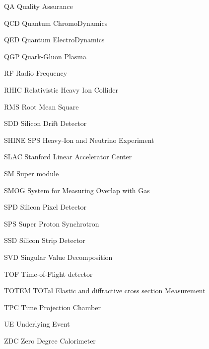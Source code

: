 \begin{abbrv}
\item[QA]				Quality Assurance
\item[QCD]			Quantum ChromoDynamics
\item[QED]			Quantum ElectroDynamics
\item[QGP]			Quark-Gluon Plasma
 

\item[RF]				Radio Frequency
\item[RHIC]			Relativistic Heavy Ion Collider
\item[RMS]			Root Mean Square

\item[SDD]			Silicon Drift Detector
\item[SHINE]			SPS Heavy-Ion and Neutrino Experiment
\item[SLAC]			Stanford Linear Accelerator Center
\item[SM]				Super module
\item[SMOG]			System for Measuring Overlap with Gas

\item[SPD]			Silicon Pixel Detector
\item[SPS]			Super Proton Synchrotron
\item[SSD]			Silicon Strip Detector
\item[SVD]			Singular Value Decomposition


\item[TOF]			Time-of-Flight detector
\item[TOTEM]			 TOTal Elastic and diffractive cross section Measurement
\item[TPC]			Time Projection Chamber

\item[UE]				Underlying Event

\item[ZDC]			Zero Degree Calorimeter
\end{abbrv}


